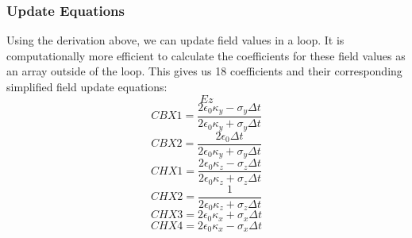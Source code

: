 \documentclass{article}
\begin{document}
\subsubsection{Update Equations}
 Using the derivation above, we can update field values in a loop. It is
 computationally more efficient to calculate the coefficients for these field
 values as an array outside of the loop. This gives us 18 coefficients and their
 corresponding simplified field update equations:
 \begin{equation}
   Ez
 \end{equation}
 \begin{equation}
   CBX1=\frac{2\epsilon_{0}\kappa_{y}-\sigma_{y}\Delta t}{2\epsilon_{0}\kappa_{y}+\sigma_{y}\Delta t}
 \end{equation}
 \begin{equation}
   CBX2=\frac{2\epsilon_{0}\Delta t}{2\epsilon_{0}\kappa_{y}+\sigma_{y}\Delta t}
 \end{equation}
 \begin{equation}
   CHX1=\frac{2\epsilon_{0}\kappa_{z}-\sigma_{z}\Delta t}{2\epsilon_{0}\kappa_{z}+\sigma_{z}\Delta t}
 \end{equation}
 \begin{equation}
   CHX2=\frac{1}{2\epsilon_{0}\kappa_{z}+\sigma_{z}\Delta t}
 \end{equation}
 \begin{equation}
   CHX3=2\epsilon_{0}\kappa_{x}+\sigma_{x}\Delta t
 \end{equation}
  \begin{equation}
   CHX4=2\epsilon_{0}\kappa_{x}-\sigma_{x}\Delta t
 \end{equation}
\end{document}

